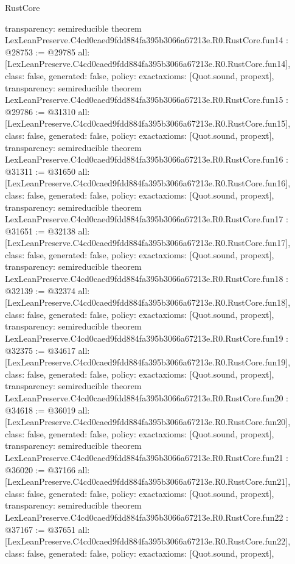 \begin{lexlean}{RustCore}
\begin{coremodule}
{  transparency: semireducible
}
theorem LexLeanPreserve.C4cd0caed9fdd884fa395b3066a67213e.R0.RustCore.fun14 : @28753 := @29785 {
  all: [LexLeanPreserve.C4cd0caed9fdd884fa395b3066a67213e.R0.RustCore.fun14],
  class: false,
  generated: false,
  policy: exact{axioms: [Quot.sound, propext]},
  transparency: semireducible
}
theorem LexLeanPreserve.C4cd0caed9fdd884fa395b3066a67213e.R0.RustCore.fun15 : @29786 := @31310 {
  all: [LexLeanPreserve.C4cd0caed9fdd884fa395b3066a67213e.R0.RustCore.fun15],
  class: false,
  generated: false,
  policy: exact{axioms: [Quot.sound, propext]},
  transparency: semireducible
}
theorem LexLeanPreserve.C4cd0caed9fdd884fa395b3066a67213e.R0.RustCore.fun16 : @31311 := @31650 {
  all: [LexLeanPreserve.C4cd0caed9fdd884fa395b3066a67213e.R0.RustCore.fun16],
  class: false,
  generated: false,
  policy: exact{axioms: [Quot.sound, propext]},
  transparency: semireducible
}
theorem LexLeanPreserve.C4cd0caed9fdd884fa395b3066a67213e.R0.RustCore.fun17 : @31651 := @32138 {
  all: [LexLeanPreserve.C4cd0caed9fdd884fa395b3066a67213e.R0.RustCore.fun17],
  class: false,
  generated: false,
  policy: exact{axioms: [Quot.sound, propext]},
  transparency: semireducible
}
theorem LexLeanPreserve.C4cd0caed9fdd884fa395b3066a67213e.R0.RustCore.fun18 : @32139 := @32374 {
  all: [LexLeanPreserve.C4cd0caed9fdd884fa395b3066a67213e.R0.RustCore.fun18],
  class: false,
  generated: false,
  policy: exact{axioms: [Quot.sound, propext]},
  transparency: semireducible
}
theorem LexLeanPreserve.C4cd0caed9fdd884fa395b3066a67213e.R0.RustCore.fun19 : @32375 := @34617 {
  all: [LexLeanPreserve.C4cd0caed9fdd884fa395b3066a67213e.R0.RustCore.fun19],
  class: false,
  generated: false,
  policy: exact{axioms: [Quot.sound, propext]},
  transparency: semireducible
}
theorem LexLeanPreserve.C4cd0caed9fdd884fa395b3066a67213e.R0.RustCore.fun20 : @34618 := @36019 {
  all: [LexLeanPreserve.C4cd0caed9fdd884fa395b3066a67213e.R0.RustCore.fun20],
  class: false,
  generated: false,
  policy: exact{axioms: [Quot.sound, propext]},
  transparency: semireducible
}
theorem LexLeanPreserve.C4cd0caed9fdd884fa395b3066a67213e.R0.RustCore.fun21 : @36020 := @37166 {
  all: [LexLeanPreserve.C4cd0caed9fdd884fa395b3066a67213e.R0.RustCore.fun21],
  class: false,
  generated: false,
  policy: exact{axioms: [Quot.sound, propext]},
  transparency: semireducible
}
theorem LexLeanPreserve.C4cd0caed9fdd884fa395b3066a67213e.R0.RustCore.fun22 : @37167 := @37651 {
  all: [LexLeanPreserve.C4cd0caed9fdd884fa395b3066a67213e.R0.RustCore.fun22],
  class: false,
  generated: false,
  policy: exact{axioms: [Quot.sound, propext]},
}
\end{coremodule}
\end{lexlean}
